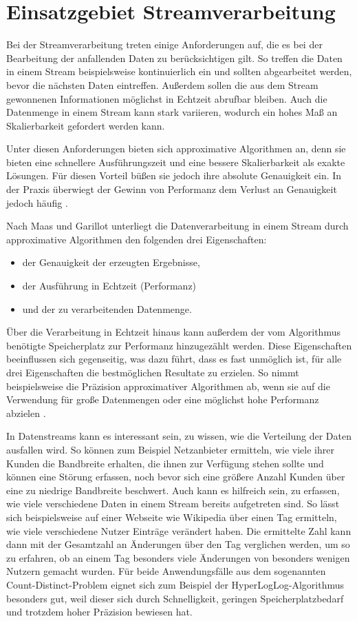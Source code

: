 \section{Einsatzgebiet Streamverarbeitung}
Bei der Streamverarbeitung treten einige Anforderungen auf, 
die es bei der Bearbeitung der anfallenden Daten zu berücksichtigen gilt. 
So treffen die Daten in einem Stream beispielsweise kontinuierlich ein 
und sollten abgearbeitet werden, bevor die nächsten Daten eintreffen. 
Außerdem sollen die aus dem Stream gewonnenen Informationen möglichst in Echtzeit abrufbar bleiben.
Auch die Datenmenge in einem Stream kann stark variieren, wodurch ein hohes Maß an Skalierbarkeit gefordert werden kann.

Unter diesen Anforderungen bieten sich approximative Algorithmen an, denn sie bieten eine schnellere Ausführungszeit und eine bessere Skalierbarkeit als exakte Lösungen. 
Für diesen Vorteil büßen sie jedoch ihre absolute Genauigkeit ein. 
In der Praxis überwiegt der Gewinn von Performanz dem Verlust an Genauigkeit jedoch häufig \cite{maas2019}. 

Nach Maas und Garillot \cite{maas2019} unterliegt die Datenverarbeitung in einem Stream durch approximative Algorithmen den folgenden drei Eigenschaften:  

\begin{itemize}
\item der Genauigkeit der erzeugten Ergebnisse,
\item der Ausführung in Echtzeit (Performanz)
\item und der zu verarbeitenden Datenmenge.
\end{itemize}

Über die Verarbeitung in Echtzeit hinaus kann außerdem der vom Algorithmus benötigte Speicherplatz zur Performanz hinzugezählt werden.
Diese Eigenschaften beeinflussen sich gegenseitig, was dazu führt, 
dass es fast unmöglich ist, für alle drei Eigenschaften die bestmöglichen Resultate zu erzielen.
So nimmt beispielsweise die Präzision approximativer Algorithmen ab, 
wenn sie auf die Verwendung für große Datenmengen oder eine möglichst hohe Performanz abzielen \cite{maas2019}.

In Datenstreams kann es interessant sein, zu wissen, 
wie die Verteilung der Daten ausfallen wird. 
So können zum Beispiel Netzanbieter ermitteln, 
wie viele ihrer Kunden die Bandbreite erhalten, die ihnen zur Verfügung stehen sollte 
und können eine Störung erfassen, 
noch bevor sich eine größere Anzahl Kunden über eine zu niedrige Bandbreite beschwert.
Auch kann es hilfreich sein, zu erfassen, 
wie viele verschiedene Daten in einem Stream bereits aufgetreten sind. 
So lässt sich beispielsweise auf einer Webseite wie Wikipedia über einen Tag ermitteln, wie viele verschiedene Nutzer Einträge verändert haben.
Die ermittelte Zahl kann dann mit der Gesamtzahl an Änderungen über den Tag verglichen werden, 
um so zu erfahren, ob an einem Tag besonders viele Änderungen von besonders wenigen Nutzern gemacht wurden.
Für beide Anwendungsfälle aus dem sogenannten Count-Distinct-Problem eignet sich zum Beispiel der HyperLogLog-Algorithmus besonders gut, 
weil dieser sich durch Schnelligkeit, geringen Speicherplatzbedarf und trotzdem hoher Präzision bewiesen hat.
